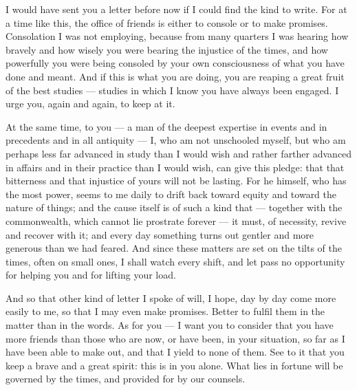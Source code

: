  I would have sent you a letter before now if I could find the kind to write. For at a time like this, the office of friends is either to console or to make promises. Consolation I was not employing, because from many quarters I was hearing how bravely and how wisely you were bearing the injustice of the times, and how powerfully you were being consoled by your own consciousness of what you have done and meant. And if this is what you are doing, you are reaping a great fruit of the best studies --- studies in which I know you have always been engaged. I urge you, again and again, to keep at it.

 At the same time, to you --- a man of the deepest expertise in events and in precedents and in all antiquity --- I, who am not unschooled myself, but who am perhaps less far advanced in study than I would wish and rather farther advanced in affairs and in their practice than I would wish, can give this pledge: that that bitterness and that injustice of yours will not be lasting. For he himself, who has the most power, seems to me daily to drift back toward equity and toward the nature of things; and the cause itself is of such a kind that --- together with the commonwealth, which cannot lie prostrate forever --- it must, of necessity, revive and recover with it; and every day something turns out gentler and more generous than we had feared. And since these matters are set on the tilts of the times, often on small ones, I shall watch every shift, and let pass no opportunity for helping you and for lifting your load.

 And so that other kind of letter I spoke of will, I hope, day by day come more easily to me, so that I may even make promises. Better to fulfil them in the matter than in the words. As for you --- I want you to consider that you have more friends than those who are now, or have been, in your situation, so far as I have been able to make out, and that I yield to none of them. See to it that you keep a brave and a great spirit: this is in you alone. What lies in fortune will be governed by the times, and provided for by our counsels.
